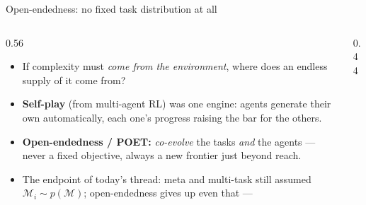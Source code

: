 \begin{frame}{Open-endedness: no fixed task distribution at all}
\begin{columns}[c]
\begin{column}{0.56\textwidth}
\begin{itemize}\footnotesize\itemsep0.5em
    \item If complexity must \emph{come from the environment}, where does an endless
          supply of it come from?
    \item \textbf{Self-play} (from multi-agent RL) was one engine: agents generate their own
           automatically, each one's progress raising the bar for the
          others.
    \item \textbf{Open-endedness / POET:} \emph{co-evolve} the tasks \emph{and} the agents
          --- never a fixed objective, always a new frontier just beyond reach.
    \item The endpoint of today's thread: meta and multi-task still assumed
          $\mathcal{M}_i \sim p(\mathcal{M})$; open-endedness gives up even that ---
\end{itemize}
\end{column}
\begin{column}{0.44\textwidth}
\centering
{}
\end{column}
\end{columns}
\end{frame}

